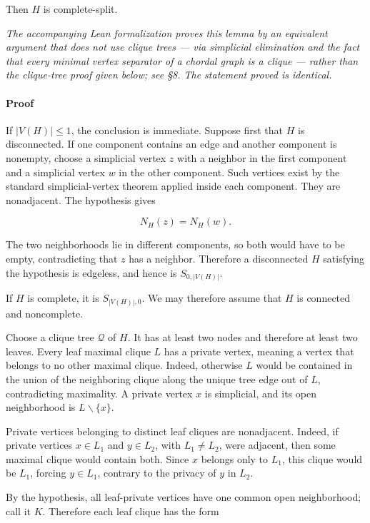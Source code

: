 \documentclass[
  american,
  11pt,
  a4paper,
]{article}
\newcounter{none} %
\begin{document}
Then \(H\) is complete-split.

\emph{The accompanying Lean formalization proves this lemma by an equivalent argument that does not use clique trees --- via simplicial elimination and the fact that every minimal vertex separator of a chordal graph is a clique --- rather than the clique-tree proof given below; see §8. The statement proved is identical.}

\paragraph{Proof}\label{proof-5}

If \(|V(H)|\le1\), the conclusion is immediate. Suppose first that \(H\) is disconnected. If one component contains an edge and another component is nonempty, choose a simplicial vertex \(z\) with a neighbor in the first component and a simplicial vertex \(w\) in the other component. Such vertices exist by the standard simplicial-vertex theorem applied inside each component. They are nonadjacent. The hypothesis gives

\[
N_H(z)=N_H(w).
\]

The two neighborhoods lie in different components, so both would have to be empty, contradicting that \(z\) has a neighbor. Therefore a disconnected \(H\) satisfying the hypothesis is edgeless, and hence is \(S_{0,|V(H)|}\).

If \(H\) is complete, it is \(S_{|V(H)|,0}\). We may therefore assume that \(H\) is connected and noncomplete.

Choose a clique tree \(\mathcal Q\) of \(H\). It has at least two nodes and therefore at least two leaves. Every leaf maximal clique \(L\) has a private vertex, meaning a vertex that belongs to no other maximal clique. Indeed, otherwise \(L\) would be contained in the union of the neighboring clique along the unique tree edge out of \(L\), contradicting maximality. A private vertex \(x\) is simplicial, and its open neighborhood is \(L\backslash\{x\}\).

Private vertices belonging to distinct leaf cliques are nonadjacent. Indeed, if private vertices \(x\in L_1\) and \(y\in L_2\), with \(L_1\ne L_2\), were adjacent, then some maximal clique would contain both. Since \(x\) belongs only to \(L_1\), this clique would be \(L_1\), forcing \(y\in L_1\), contrary to the privacy of \(y\) in \(L_2\).

By the hypothesis, all leaf-private vertices have one common open neighborhood; call it \(K\). Therefore each leaf clique has the form
\end{document}
